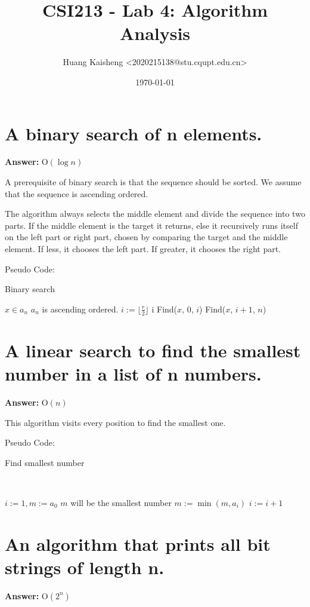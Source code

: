 \documentclass[12pt]{article}
\title{CSI213 - Lab 4: Algorithm Analysis}
\author{Huang Kaisheng <2020215138@stu.cqupt.edu.cn>}
\date{\today}
\begin{document}
\newcommand\answer[1]{ \textbf{Answer: }\space $\mathrm{O}(#1)$ }
\maketitle
\newpage
\tableofcontents
\newpage

\section{A binary search of n elements.}
\answer{\log n}

A prerequisite of binary search is that the sequence should be  sorted. We assume that the sequence is ascending ordered.

The algorithm always selects the middle element and divide the sequence into two parts. If the middle element is the target it returns, else it recursively runs itself on the left part or right part, chosen by comparing the target and the middle element. If less, it chooses the left part. If greater, it chooses the right part.

Pseudo Code: 
\begin{algorithm}
\caption{Binary search}
\begin{algorithmic}[1] 
	\Require $ x \in a_n $
	\Ensure $ a_n $ is ascending ordered.
	\State $i := \lfloor \frac{r}{2} \rfloor$
	 \Return i
	 \Return Find($x$, $0$, $i$)
	\Else \space \Return Find($x$, $i + 1$, $n$)
	\EndIf
	\EndProcedure
\end{algorithmic}
\end{algorithm}
\section{A linear search to find the smallest number in a list of n numbers.}
\answer{n}

This algorithm visits every position to find the smallest one.

Pseudo Code:
\begin{algorithm}
\caption{Find smallest number}
\
\begin{algorithmic}[1] 
	\State $i := 1, m := a_0$ \Comment $m$ will be the smallest number
	\While {$i < n$}
		\State $ m := \min(m, a_i) $
		\State $ i := i + 1 $
	\EndWhile
\end{algorithmic}
\end{algorithm}

\section{An algorithm that prints all bit strings of length n.}
\answer{2^n}
\end{document}
